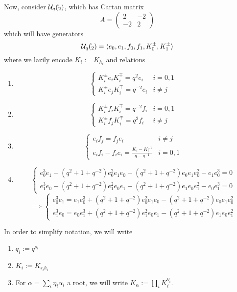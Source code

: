 \documentclass[11pt,leqno,oneside]{amsart}
\numberwithin{thm}{section}
\newcommand{\U}{\mathcal{U}}
\begin{document}
\begin{example}
  Now, consider \(\U_q(\hat{\sl}_2)\), which has Cartan matrix \[
    A = \left(
      \begin{array}{cc}
        2&-2\\
        -2&2
      \end{array}
    \right)
  \]
  which will have generators \[
    \U_q(\hat{\sl}_2) = \langle e_0, e_1, f_0, f_1, K_0^{\pm}, K_1^{\pm} \rangle
  \]
  where we lazily encode \(K_i := K_{h_i}\) and relations
  \begin{enumerate}
  \item \[
      \begin{cases}
        K_i^\pm e_i K_i^\mp = q^2 e_i & i = 0,1\\
        K_i^\pm e_j K_i^\mp = q^{-2} e_i & i \neq j
      \end{cases}
    \]
  \item \[
      \begin{cases}
        K_i^\pm f_i K_i^\mp = q^{-2} f_i & i = 0,1\\
        K_i^\pm f_j K_i^\mp = q^{2} f_i & i \neq j
      \end{cases}
    \]
  \item \[
      \begin{cases}
        e_i f_j = f_j e_i & i \neq j\\
        e_i f_i - f_i e_i = \frac{K_i - K_i^{-1}}{q-q^{-1}} & i = 0,1
      \end{cases}
    \]
  \item \[
      \begin{cases}
        e_0^3 e_1 - (q^2+1+q^{-2}) e_0^2 e_1 e_0 + (q^2+1+q^{-2}) e_0
        e_1 e_0^2 - e_1 e_0^3 = 0\\
        e_1^3 e_0 - (q^2+1+q^{-2}) e_1^2 e_0 e_1 + (q^2+1+q^{-2}) e_1
        e_0 e_1^2 - e_0 e_1^3 = 0
      \end{cases}
    \]\[
      \implies
      \begin{cases}
        e_0^3 e_1 = e_1 e_0^3  + (q^2+1+q^{-2}) e_0^2 e_1 e_0 -
        (q^2+1+q^{-2}) e_0 e_1 e_0^2\\
        e_1^3 e_0 = e_0 e_1^3 + (q^2+1+q^{-2}) e_1^2 e_0 e_1 -
        (q^2+1+q^{-2}) e_1 e_0 e_1^2
      \end{cases}
    \]
  \end{enumerate}
\end{example}
\begin{defn}
  In order to simplify notation, we will write
  \begin{enumerate}
  \item \(q_i := q^{s_i}\)
  \item \(K_i := K_{s_i h_i}\)
  \item For \(\alpha = \sum_i \eta_i \alpha_i\) a root, we will write
    \(K_\alpha := \prod_i K_i^{\eta_i}\).
  \end{enumerate}
\end{defn}
\end{document}
